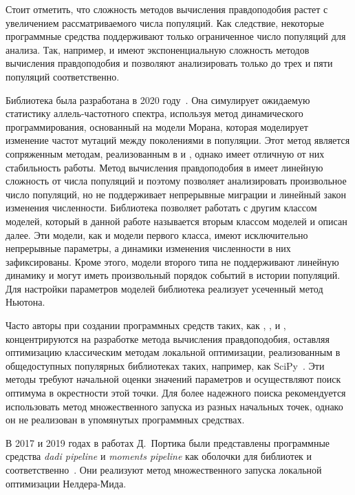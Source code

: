 Стоит отметить, что сложность методов вычисления правдоподобия растет с увеличением рассматриваемого числа популяций.
Как следствие, некоторые программные средства поддерживают только ограниченное число популяций для анализа.
Так, например, \dadi и \moments имеют экспоненциальную сложность методов вычисления правдоподобия и позволяют анализировать только до трех и пяти популяций соответственно.

Библиотека \momi была разработана в 2020 году~\cite{kamm2020efficiently}.
Она симулирует ожидаемую статистику аллель-частотного спектра, используя метод динамического программирования, основанный на модели Морана, которая моделирует изменение частот мутаций между поколениями в популяции.
Этот метод является сопряженным методам, реализованным в \dadi и \moments, однако имеет отличную от них стабильность работы.
Метод вычисления правдоподобия в \momi имеет линейную сложность от числа популяций и поэтому позволяет анализировать произвольное число популяций, но не поддерживает непрерывные миграции и линейный закон изменения численности.
Библиотека \momi позволяет работать с другим классом моделей, который в данной работе называется вторым классом моделей и описан далее.
Эти модели, как и модели первого класса, имеют исключительно непрерывные параметры, а динамики изменения численности в них зафиксированы.
Кроме этого, модели второго типа не поддерживают линейную динамику и могут иметь произвольный порядок событий в истории популяций.
Для настройки параметров моделей библиотека \momi реализует усеченный метод Ньютона.

Часто авторы при создании программных средств таких, как \dadi, \moments, \momentsLD и \momi, концентрируются на разработке метода вычисления правдоподобия, оставляя оптимизацию классическим методам локальной оптимизации, реализованным в общедоступных популярных библиотеках таких, например, как SciPy~\cite{virtanen2020scipy}.
Эти методы требуют начальной оценки значений параметров и осуществляют поиск оптимума в окрестности этой точки.
Для более надежного поиска рекомендуется использовать метод множественного запуска из разных начальных точек, однако он не реализован в упомянутых программных средствах.

В 2017 и 2019 годах в работах Д.~Портика были представлены программные средства \textit{dadi pipeline} и \textit{moments pipeline} как оболочки для библиотек \dadi и \moments соответственно~\cite{portik2017evaluating, leache2019exploring}.
Они реализуют метод множественного запуска локальной оптимизации Нелдера-Мида.


